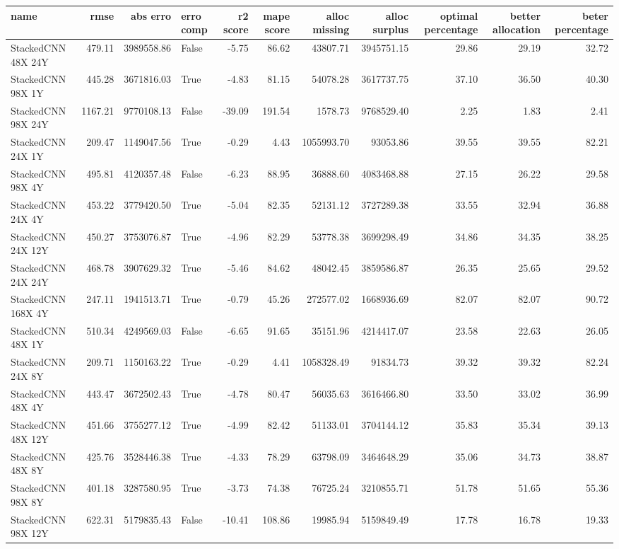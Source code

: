 \begin{tabular}{lrrlrrrrrrr}
\toprule
name & rmse & abs erro & erro comp & r2 score & mape score & alloc missing & alloc surplus & optimal percentage & better allocation & beter percentage \\
\midrule
StackedCNN 48X 24Y & 479.11 & 3989558.86 & False & -5.75 & 86.62 & 43807.71 & 3945751.15 & 29.86 & 29.19 & 32.72 \\
StackedCNN 98X 1Y & 445.28 & 3671816.03 & True & -4.83 & 81.15 & 54078.28 & 3617737.75 & 37.10 & 36.50 & 40.30 \\
StackedCNN 98X 24Y & 1167.21 & 9770108.13 & False & -39.09 & 191.54 & 1578.73 & 9768529.40 & 2.25 & 1.83 & 2.41 \\
StackedCNN 24X 1Y & 209.47 & 1149047.56 & True & -0.29 & 4.43 & 1055993.70 & 93053.86 & 39.55 & 39.55 & 82.21 \\
StackedCNN 98X 4Y & 495.81 & 4120357.48 & False & -6.23 & 88.95 & 36888.60 & 4083468.88 & 27.15 & 26.22 & 29.58 \\
StackedCNN 24X 4Y & 453.22 & 3779420.50 & True & -5.04 & 82.35 & 52131.12 & 3727289.38 & 33.55 & 32.94 & 36.88 \\
StackedCNN 24X 12Y & 450.27 & 3753076.87 & True & -4.96 & 82.29 & 53778.38 & 3699298.49 & 34.86 & 34.35 & 38.25 \\
StackedCNN 24X 24Y & 468.78 & 3907629.32 & True & -5.46 & 84.62 & 48042.45 & 3859586.87 & 26.35 & 25.65 & 29.52 \\
StackedCNN 168X 4Y & 247.11 & 1941513.71 & True & -0.79 & 45.26 & 272577.02 & 1668936.69 & 82.07 & 82.07 & 90.72 \\
StackedCNN 48X 1Y & 510.34 & 4249569.03 & False & -6.65 & 91.65 & 35151.96 & 4214417.07 & 23.58 & 22.63 & 26.05 \\
StackedCNN 24X 8Y & 209.71 & 1150163.22 & True & -0.29 & 4.41 & 1058328.49 & 91834.73 & 39.32 & 39.32 & 82.24 \\
StackedCNN 48X 4Y & 443.47 & 3672502.43 & True & -4.78 & 80.47 & 56035.63 & 3616466.80 & 33.50 & 33.02 & 36.99 \\
StackedCNN 48X 12Y & 451.66 & 3755277.12 & True & -4.99 & 82.42 & 51133.01 & 3704144.12 & 35.83 & 35.34 & 39.13 \\
StackedCNN 48X 8Y & 425.76 & 3528446.38 & True & -4.33 & 78.29 & 63798.09 & 3464648.29 & 35.06 & 34.73 & 38.87 \\
StackedCNN 98X 8Y & 401.18 & 3287580.95 & True & -3.73 & 74.38 & 76725.24 & 3210855.71 & 51.78 & 51.65 & 55.36 \\
StackedCNN 98X 12Y & 622.31 & 5179835.43 & False & -10.41 & 108.86 & 19985.94 & 5159849.49 & 17.78 & 16.78 & 19.33 \\

\end{tabular}
